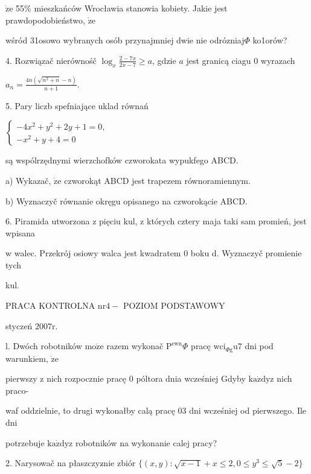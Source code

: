 \documentclass[a4paper,12pt]{article}
\begin{document}
$\dot{\mathrm{z}}\mathrm{e}$ 55\% mieszkańców Wrocławia stanowia kobiety. Jakie jest prawdopodobieństwo, $\dot{\mathrm{z}}\mathrm{e}$

wśród 31osowo wybranych osób przynajmniej dwie nie odrózniaj$\Phi$ ko1orów?

4. Rozwiązač nierównośč $\displaystyle \log_{x}\frac{2-7x}{2x-7}\geq a$, gdzie $a$ jest granicą ciagu $0$ wyrazach

$a_{n}=\displaystyle \frac{4n(\sqrt{n^{2}+n}-n)}{n+1}.$

5. Pary liczb spefniające uklad równań

$\left\{\begin{array}{l}
-4x^{2}+y^{2}+2y+1=0,\\
-x^{2}+y+4=0
\end{array}\right.$

są wspólrzędnymi wierzchofków czworokata wypukfego ABCD.

a) Wykazač, $\dot{\mathrm{z}}\mathrm{e}$ czworokąt ABCD jest trapezem równoramiennym.

b) Wyznaczyč równanie okręgu opisanego na czworokącie ABCD.

6. Piramida utworzona z pięciu kul, z których cztery maja taki sam promień, jest wpisana

w walec. Przekrój osiowy walca jest kwadratem 0 boku d. Wyznaczyč promienie tych

kul.





PRACA KONTROLNA $\mathrm{n}\mathrm{r}4-$ POZIOM PODSTAWOWY

styczeń $2007\mathrm{r}.$

l. Dwóch robotników $\mathrm{m}\mathrm{o}\dot{\mathrm{z}}\mathrm{e}$ razem wykonač $\mathrm{P}^{\mathrm{e}\mathrm{w}\mathrm{n}}\Phi$ pracę $\mathrm{w}\mathrm{c}\mathrm{i}_{\Phi \mathrm{g}}\mathrm{u}7$ dni pod warunkiem, $\dot{\mathrm{z}}\mathrm{e}$

pierwszy $\mathrm{z}$ nich rozpocznie pracę $0$ póltora dnia wcześniej Gdyby $\mathrm{k}\mathrm{a}\dot{\mathrm{z}}\mathrm{d}\mathrm{y}\mathrm{z}$ nich praco-

waf oddzielnie, to drugi wykonałby calą pracę $03$ dni wcześniej od pierwszego. Ile dni

potrzebuje $\mathrm{k}\mathrm{a}\dot{\mathrm{z}}\mathrm{d}\mathrm{y}\mathrm{z}$ robotników na wykonanie calej pracy?

2. Narysowač na płaszczyz$\acute{}$nie zbiór $\{(x,y):\sqrt{x-1}+x\leq 2,0\leq y^{3}\leq\sqrt{5}-2\}$
\end{document}
